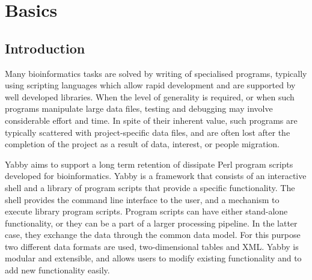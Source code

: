 

\setcounter{section}{0}

\chapter{Basics}

\section{Introduction}

Many bioinformatics tasks are solved by writing of specialised programs,
typically using scripting languages which allow rapid development and are
supported by well developed libraries. When the level of generality is
required, or when such programs manipulate large data files, testing and
debugging may involve considerable effort and time. In spite of their
inherent value, such programs are typically scattered with project-specific
data files, and are often lost after the completion of the project as a
result of data, interest, or people migration.

Yabby aims to support a long term retention of dissipate Perl program
scripts developed for bioinformatics. Yabby is a framework that consists
of an interactive shell and a library of program scripts that provide
a specific functionality. The shell provides the command line interface
to the user, and a mechanism to execute library program scripts. Program
scripts can have either stand-alone functionality, or they can be a part
of a larger processing pipeline. In the latter case, they exchange the
data through the common data model. For this purpose two different data
formats are used, two-dimensional tables and XML. Yabby is modular and
extensible, and allows users to modify existing functionality and to add
new functionality easily.

